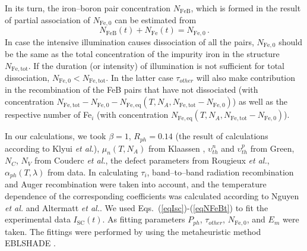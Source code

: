\documentclass[%
 aip,jap,
 amsmath,amssymb,
 reprint,%
]{revtex4-1}
\begin{document}
In its turn, the iron--boron pair concentration $N_\mathrm{FeB}$, which is formed in the result of partial association of $N_\mathrm{Fe,0}$ can be estimated from
\begin{equation}
\label{eqNFeBt}
N_\mathrm{FeB}(t)+N_\mathrm{Fe}(t)=N_\mathrm{Fe,0}\,.
\end{equation}
In case the intensive illumination causes dissociation of all the pairs, 
$N_\mathrm{Fe,0}$ should be the same as the total concentration of the impurity iron in the structure $N_\mathrm{Fe,tot}$. 
If the duration (or intensity) of illumination is not sufficient for total dissociation, 
$N_\mathrm{Fe,0}< N_\mathrm{Fe,tot}$. 
In the latter case $\tau_{other}$ will also make contribution in the 
recombination of the FeB pairs that have not dissociated 
(with concentration $N_\mathrm{Fe,tot}-N_\mathrm{Fe,0}-N_\mathrm{Fe,eq}(T, N_A, N_\mathrm{Fe,tot}-N_\mathrm{Fe,0})$)
as well as the respective number of Fe$_i$ 
(with concentration $N_\mathrm{Fe,eq}(T, N_A, N_\mathrm{Fe,tot}-N_\mathrm{Fe,0})$).

In our calculations, 
we took $\beta=1$, 
$R_{ph}=0.14$ (the result of calculations  according to Klyui \emph{et al.}\cite{KostRefl2000}),
$\mu_n(T, N_A)$ from Klaassen \cite{KLAASSEN953}, 
$\upsilon_{th}^n$ and $\upsilon_{th}^p$ from Green\cite{Nc:Green},
$N_C$, $N_V$ from Couderc \emph{et al.}\cite{Si_ni_Couderc}, 
the defect parameters from Rougieux \emph{et al.}\cite{ROUGIEUX2018}, 
$\alpha_{ph} (T,\lambda)$ from data\cite{Si:Absorb,GreenOptic}. 
In calculating $\tau_i$, band--to--band radiation recombination and Auger recombination were taken into account, 
and the temperature dependence of the corresponding coefficients 
was calculated according to Nguyen \emph{et al.}\cite{Si_BtB} and Altermatt \emph{et al.}\cite{Si_Auger}. 
We used Eqs.~(\ref{eqIsc})-(\ref{eqNFeBt}) to fit the experimental data $I_\mathrm{SC}(t)$. 
As fitting parameters  $P_{ph}$, $\tau_{other}$, $N_\mathrm{Fe,0}$, and $E_m$  were taken. 
The fittings were performed by using the metaheuristic method EBLSHADE \cite{EBLSHADE}.
\end{document}
